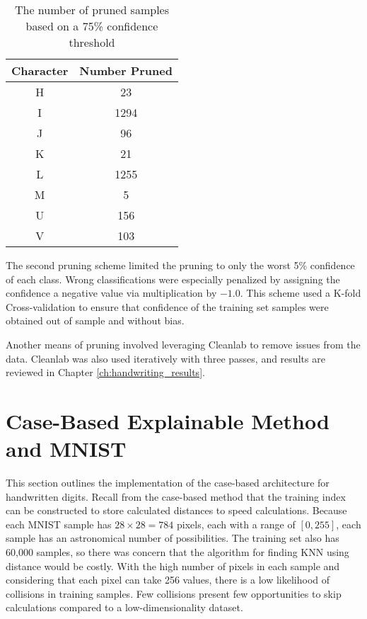 \begin{table}
    \renewcommand{\arraystretch}{1.3}
    \centering
    \caption{The number of pruned samples based on a 75\% confidence threshold}
    \begin{tabular}{|c|c|}
        \hline
        Character & Number Pruned \\
        \hline
        \hline
        H & 23 \\   \hline
        I & 1294 \\ \hline
        J & 96 \\   \hline
        K & 21 \\   \hline
        L & 1255 \\ \hline
        M & 5 \\    \hline
        U & 156 \\  \hline
        V & 103 \\
        \hline
    \end{tabular}
    \label{tab:threshold_pruning_qty}
\end{table}

The second pruning scheme limited the pruning to only the worst 5\% confidence
of each class. Wrong classifications were especially penalized by assigning the
confidence a negative value via multiplication by $-1.0$. This scheme used a
K-fold Cross-validation to ensure that confidence of the training set samples
were obtained out of sample and without bias.

Another means of pruning involved leveraging Cleanlab to remove issues from the
data. Cleanlab was also used iteratively with three passes, and results are
reviewed in Chapter \ref{ch:handwriting_results}.

\section{Case-Based Explainable Method and MNIST}

This section outlines the implementation of the case-based architecture for
handwritten digits. Recall from the case-based method that the training index
can be constructed to store calculated distances to speed calculations. Because
each MNIST sample has $28\times28=784$ pixels, each with a range of $[0, 255]$,
each sample has an astronomical number of possibilities. The training set also
has 60,000 samples, so there was concern that the algorithm for finding KNN
using distance would be costly. With the high number of pixels in each sample
and considering that each pixel can take 256 values, there is a low likelihood
of collisions in training samples. Few collisions present few opportunities to
skip calculations compared to a low-dimensionality dataset.


